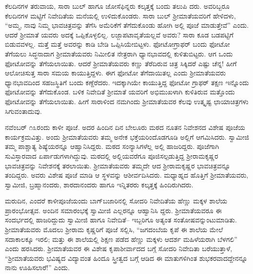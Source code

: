 ಕೆಲದಿನಗಳ ತರುವಾಯ, ಸಾರಾ ಬುಲ್ ಹಾಗೂ ಜೋಸೆಫಿನ್ನರು ಕಲ್ಕತ್ತಕ್ಕೆ ಬಂದು ತಲುಪಿ ದರು. ಅವರಿಬ್ಬರೂ ಕೆಲದಿನಗಳ ಮಟ್ಟಿಗೆ ನಿವೇದಿತೆಯ ಮನೆಯಲ್ಲಿ ಉಳಿದುಕೊಂಡರು. ಸಾರಾ ಬುಲ್ ಶ್ರೀಮಾತೆಯವರಿಗೆ ಹೇಳಿದಳು, “ಅಮ್ಮ, ನಾವು ನಿಮ್ಮ ಭಾವಚಿತ್ರವನ್ನು ತೆಗೆಸಿ ಅಮೆರಿಕೆಗೆ ತೆಗೆದುಕೊಂಡು ಹೋಗಿ ಅಲ್ಲಿ ಪೂಜೆ ಮಾಡುತ್ತೇವೆ” ಎಂದು. ಆದರೆ ಶ್ರೀಮಾತೆ ಯವರು ಅದಕ್ಕೆ ಒಪ್ಪಿಕೊಳ್ಳಲಿಲ್ಲ. ಲಜ್ಜಾಪಟಾವೃತೆಯಲ್ಲವೆ ಅವರು? ಸಾರಾ ಕೂಡ ಬಡಪಟ್ಟಿಗೆ ಬಿಡುವವಳಲ್ಲ. ಮತ್ತೆ ಮತ್ತೆ ಅವರನ್ನು ಕಾಡಿ ಬೇಡಿ ಒಪ್ಪಿಸಿಯೇಬಿಟ್ಟಳು. ಫೋಟೋಗ್ರಾಫರ್ ಬಂದು ಫೋಟೋ ತೆಗೆಯಲು ಸಿದ್ಧನಾದಾಗ ಶ್ರೀಮಾತೆಯವರು ನಿಮೀಲಿತ ನೇತ್ರರಾಗಿ ಧ್ಯಾನಭಾವದಲ್ಲಿ ಕುಳಿತುಬಿಟ್ಟರು. ಆಗ ಒಂದು ಫೋಟೋವನ್ನು ತೆಗೆಯಲಾಯಿತು. ಆದರೆ ಶ್ರೀಮಾತೆಯವರು ಕಣ್ಣು ತೆರೆದಿರುವ ಚಿತ್ರ ಸಿಕ್ಕಿದರೆ ಎಷ್ಟು ಚೆನ್ನ! ಹೀಗೆ ಆಲೋಚಿಸುತ್ತ ಸಾರಾ ಸಮಯ ಕಾಯುತ್ತಿದ್ದಳು. ಈಗ ಫೋಟೋ ತೆಗೆದಾಯಿತಲ್ಲ ಎಂದು ಶ್ರೀಮಾತೆಯವರು ಧ್ಯಾನಭಾವದಿಂದ ಸಹಜಸ್ಥಿತಿಗೆ ಬಂದು ಕಣ್ದೆರೆದರು. ಇದಕ್ಕಾಗಿಯೇ ಕಾಯುತ್ತಿದ್ದ ಫೋಟೋ ಗ್ರಾಫರ್ ತಕ್ಷಣ ಇನ್ನೊಂದು ಫೋಟೋವನ್ನು ತೆಗೆದುಕೊಂಡ. ಬಳಿಕ ನಿವೇದಿತೆ ಶ್ರೀಮಾತೆ ಯವರಿಗೆ ಅಭಿಮುಖಳಾಗಿ ಕುಳಿತಿರುವ ಮತ್ತೊಂದು ಫೋಟೋವನ್ನು ತೆಗೆಯಲಾಯಿತು. ಹೀಗೆ ಸಾರಾಳಿಂದ ನಮಗಿಂದು ಶ್ರೀಮಾತೆಯವರ ಕೆಲವು ಉತ್ಕೃಷ್ಟ ಛಾಯಾಚಿತ್ರಗಳು ಸಿಗುವಂತಾದುವು.

ನವೆಂಬರ್ ೧೩ರಂದು ಕಾಳೀ ಪೂಜೆ. ಅದರ ಹಿಂದಿನ ದಿನ ಬೇಲೂರು ಮಠದ ನೂತನ ನಿವೇಶನದ ವಿಶೇಷ ಪೂಜೆಯ ಕಾರ್ಯಕ್ರಮವಿತ್ತು. ಅಂದು ಶ್ರೀಮಾತೆಯವರು ತಮ್ಮ ಅನೇಕ ಭಕ್ತೆಯರಿಂದೊಡಗೂಡಿ ಅಲ್ಲಿಗೆ ಆಗಮಿಸಿದರು. ಸ್ವಾಮೀಜಿ ತಮ್ಮ ಪಾಶ್ಚಾತ್ಯ ಶಿಷ್ಯೆಯರನ್ನೂ ಆಹ್ವಾನಿಸಿದ್ದರು. ಮಠದ ಸಂನ್ಯಾಸಿಗಳೆಲ್ಲ ಅಲ್ಲಿ ಹಾಜರಿದ್ದರು. ಪೂಜೆಗಾಗಿ ಸುವಿಸ್ತಾರವಾದ ಏರ್ಪಾಡುಗಳಾಗಿದ್ದುವು. ಮಠದಲ್ಲಿ ಅಲ್ಲಿಯವರೆಗೂ ಪೂಜಿಸಲ್ಪಡುತ್ತಿದ್ದ ಶ್ರೀರಾಮಕೃಷ್ಣರ ಭಾವಚಿತ್ರವನ್ನು ನಿವೇಶನಕ್ಕೆ ತರಲಾಯಿತು. ಶ್ರೀಮಾತೆಯವರು ತಮ್ಮದೇ ಆದ ಶ್ರೀರಾಮಕೃಷ್ಣರ ಭಾವಚಿತ್ರವನ್ನೂ ತಂದಿದ್ದರು. ಅವರು ವಿಶೇಷ ಪೂಜೆ ಮಾಡಿ ಆ ಸ್ಥಳವನ್ನು ಆಶೀರ್ವದಿಸಿದರು. ಮಧ್ಯಾಹ್ನದ ಹೊತ್ತಿಗೆ ಶ್ರೀಮಾತೆಯವರು, ಸ್ವಾಮೀಜಿ, ಬ್ರಹ್ಮಾನಂದರು, ಶಾರದಾನಂದರು ಹಾಗೂ ಇನ್ನಿತರರು ಕಲ್ಕತ್ತಕ್ಕೆ ಹಿಂದಿರುಗಿದರು.

ಮರುದಿನ, ಎಂದರೆ ಕಾಳೀಪೂಜೆಯಂದು ಬಾಗ್​ಬಜಾರಿನಲ್ಲಿ ಸೋದರಿ ನಿವೇದಿತೆಯ ಹೆಣ್ಣು ಮಕ್ಕಳ ಶಾಲೆಯ ಪ್ರಾರಂಭೋತ್ಸವ. ಅಂದಿನ ಸಮಾರಂಭಕ್ಕೆ ಸ್ವಾಮೀಜಿ ಎಲ್ಲರನ್ನೂ ಆಹ್ವಾನಿಸಿ ದ್ದರು. ಶ್ರೀಮಾತೆಯವರೂ ಈ ಸಂದರ್ಭದಲ್ಲಿ ಹಾಜರಿದ್ದುದು ಸ್ವಾಮೀಜಿ ಹಾಗೂ ನಿವೇದಿತೆ– ಇಬ್ಬರಿಗೂ ಅತ್ಯಂತ ಸಂತೋಷವನ್ನುಂಟುಮಾಡಿತು. ಶ್ರೀಮಾತೆಯವರು ಮೊದಲು ಶ್ರೀರಾಮ ಕೃಷ್ಣರಿಗೆ ಪೂಜೆ ಸಲ್ಲಿಸಿ, “ಜಗದಂಬೆಯ ಕೃಪೆ ಈ ಶಾಲೆಯ ಮೇಲೆ ಸದಾಕಾಲಕ್ಕೂ ಇರಲಿ; ಮತ್ತು ಈ ಶಾಲೆಯಲ್ಲಿ ಶಿಕ್ಷಣ ಪಡೆದ ಹೆಣ್ಣು ಮಕ್ಕಳು ಆದರ್ಶ ಮಹಿಳೆಯರಾಗಿ ಬೆಳಗಲಿ” ಎಂದು ಹರಸಿದರು. ಶ್ರೀಮಾತೆಯವರ ಈ ವಿಶೇಷ ಕೃಪಾಶೀರ್ವಾದದ ಬಗ್ಗೆ ಸೋದರಿ ನಿವೇದಿತಾ ಬರೆಯುತ್ತಾಳೆ, “ಶ್ರೀಮಾತೆಯವರು ಭವಿಷ್ಯದ ವಿದ್ಯಾವಂತ ಹಿಂದೂ ಸ್ತ್ರೀತ್ವದ ಬಗ್ಗೆ ಆಡಿದ ಈ ಮಾತುಗಳಿಗಿಂತ ಶುಭಕರವಾದದ್ದೇನನ್ನೂ ನಾನು ಊಹಿಸಲಾರೆ!” ಎಂದು.

